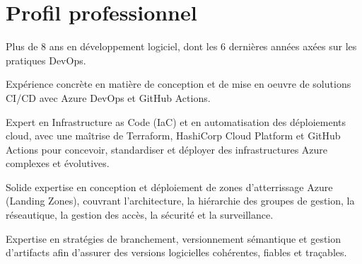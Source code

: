 \documentclass[11pt]{deedy-resume-openfont}
\begin{document}

\vspace{0.5cm}
\section{Profil professionnel}
\vspace{0.2cm}
\begin{tightemize}
\item Plus de 8 ans en développement logiciel, dont les 6 dernières années axées sur les pratiques DevOps.
\item Expérience concrète en matière de conception et de mise en oeuvre de solutions CI/CD avec Azure DevOps et GitHub Actions.
\item Expert en Infrastructure as Code (IaC) et en automatisation des déploiements cloud, avec une maîtrise de Terraform, HashiCorp Cloud Platform et GitHub Actions pour concevoir, standardiser et déployer des infrastructures Azure complexes et évolutives.
\item Solide expertise en conception et déploiement de zones d'atterrissage Azure (Landing Zones), couvrant l'architecture, la hiérarchie des groupes de gestion, la réseautique, la gestion des accès, la sécurité et la surveillance.
\item Expertise en stratégies de branchement, versionnement sémantique et gestion d'artifacts afin d'assurer des versions logicielles cohérentes, fiables et traçables.
\end{tightemize}

\vspace{0.5cm}
\end{document}
